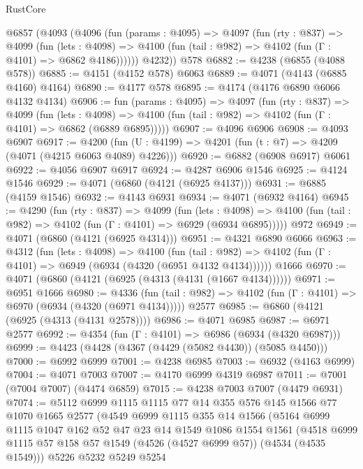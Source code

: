 \begin{lexlean}{RustCore}
\begin{coremodule}
    @6857
      (@4093
        (@4096
          (fun (params : @4095) =>
          @4097
            (fun (rty : @837) =>
            @4099
              (fun (lets : @4098) =>
              @4100 (fun (tail : @982) => @4102 (fun (Γ : @4101) => @6862 @4186))))))
        @4232))
    @578
@6882 := @4238 (@6855 (@4088 @578))
@6885 := @4151 (@4152 @578) @6063
@6889 := @4071 (@4143 (@6885 @4160) @4164)
@6890 := @4177 @578
@6895 := @4174 (@4176 @6890 @6066 @4132 @4134)
@6906 := fun (params : @4095) =>
  @4097
    (fun (rty : @837) =>
    @4099
      (fun (lets : @4098) =>
      @4100 (fun (tail : @982) => @4102 (fun (Γ : @4101) => @6862 (@6889 @6895)))))
@6907 := @4096 @6906
@6908 := @4093 @6907
@6917 := @4200 (fun (U : @4199) => @4201 (fun (t : @7) => @4209 (@4071 (@4215 @6063 @4089) @4226)))
@6920 := @6882 (@6908 @6917) @6061
@6922 := @4056 @6907 @6917
@6924 := @4287 @6906 @1546
@6925 := @4124 @1546
@6929 := @4071 (@6860 (@4121 (@6925 @4137)))
@6931 := @6885 (@4159 @1546)
@6932 := @4143 @6931
@6934 := @4071 (@6932 @4164)
@6945 := @4290
    (fun (rty : @837) =>
    @4099
      (fun (lets : @4098) =>
      @4100 (fun (tail : @982) => @4102 (fun (Γ : @4101) => @6929 (@6934 @6895)))))
    @972
@6949 := @4071 (@6860 (@4121 (@6925 @4314)))
@6951 := @4321 @6890 @6066
@6963 := @4312
    (fun (lets : @4098) =>
    @4100
      (fun (tail : @982) => @4102 (fun (Γ : @4101) => @6949 (@6934 (@4320 (@6951 @4132 @4134))))))
    @1666
@6970 := @4071 (@6860 (@4121 (@6925 (@4313 (@4131 (@1667 @4134))))))
@6971 := @6951 @1666
@6980 := @4336
    (fun (tail : @982) => @4102 (fun (Γ : @4101) => @6970 (@6934 (@4320 (@6971 @4134)))))
    @2577
@6985 := @6860 (@4121 (@6925 (@4313 (@4131 @2578))))
@6986 := @4071 @6985
@6987 := @6971 @2577
@6992 := @4354 (fun (Γ : @4101) => @6986 (@6934 (@4320 @6987)))
@6999 := @4423 (@4428 (@4367 (@4429 (@5082 @4430)) (@5085 @4450)))
@7000 := @6992 @6999
@7001 := @4238 @6985
@7003 := @6932 (@4163 @6999)
@7004 := @4071 @7003
@7007 := @4170 @6999 @4319 @6987
@7011 := @7001 (@7004 @7007) (@4474 @6859)
@7015 := @4238 @7003 @7007 (@4479 @6931)
@7074 := @5112
    @6999
    @1115
    @1115
    @77
    @14
    @355
    @576
    @145
    @1566
    @77
    @1070
    @1665
    @2577
    (@4549
      @6999
      @1115
      @355
      @14
      @1566
      (@5164
        @6999
        @1115
        @1047
        @162
        @52
        @47
        @23
        @14
        @1549
        @1086
        @1554
        @1561
        (@4518 @6999 @1115 @57 @158 @57 @1549 (@4526 (@4527 @6999 @57)) (@4534 (@4535 @1549)))
        @5226
        @5232
        @5249
        @5254

\end{coremodule}
\end{lexlean}
